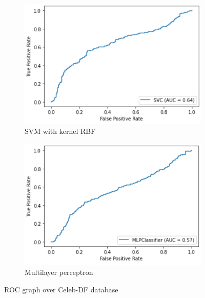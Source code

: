 \documentclass[11pt]{article}
\begin{document}
    \begin{figure}
        \centering
        \begin{subfigure}[b]{0.475\textwidth}
            \centering
            \includegraphics[width=\textwidth]{imgs/SVM_test.PNG}
            \caption[]{{\small SVM with kernel RBF}}    
        \end{subfigure}
        \hfill
        \begin{subfigure}[b]{0.475\textwidth}  
            \centering 
            \includegraphics[width=\textwidth]{imgs/MLP_test.PNG}
            \caption[]{{\small Multilayer perceptron}}    
        \end{subfigure}
        \caption[]{\small ROC graph over Celeb-DF database} 
        \label{fig:test_celeb}
    \end{figure}
\end{document}
